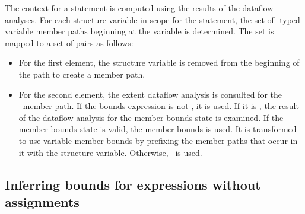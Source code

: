\begin{enumerate}
The context for a statement is computed using the results of the dataflow analyses.
For each structure variable in scope for the statement, the set of \arrayptr-typed variable member paths 
beginning at the variable is determined.  The set is mapped to a set of pairs as follows:
\begin{itemize}
\item For the first element, the structure variable is removed from the beginning of the
path to create a member path.
\item For the second element, the extent dataflow analysis is consulted for the \arrayptr\ member path.
   If the bounds expression is not \boundsunknown, it is used.   If it is \boundsunknown, the result
   of the dataflow analysis for the member bounds state is examined. If the member bounds
   state is valid, the member bounds is used.  It is transformed to use variable member
   bounds by prefixing the member paths that occur in it with the structure variable.
   Otherwise, \boundsunknown\ is used.
\end{itemize}

\subsection{Inferring bounds for expressions without assignments}


\end{enumerate}
